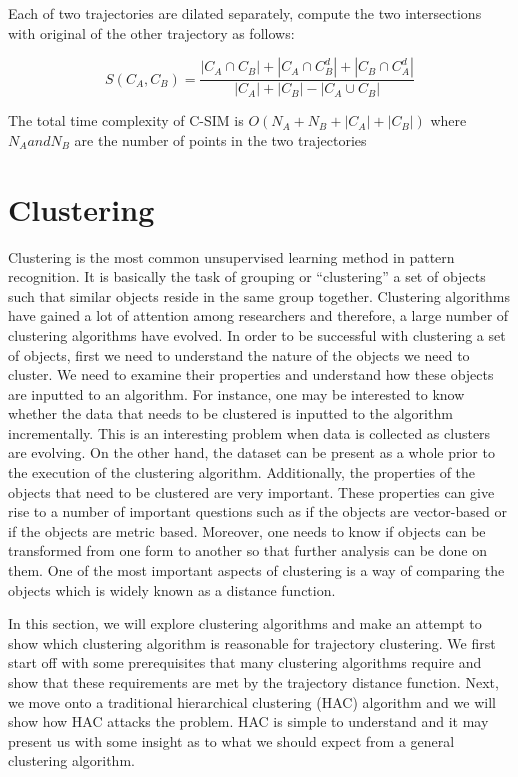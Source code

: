 \documentclass[a4paper, 12pt]{article}
\begin{document}
Each of two trajectories are dilated separately, compute the two intersections with original of the other trajectory as follows:

\begin{equation} \label{eq13}
    S(C_A, C_B) = \frac{|C_A \cap C_B| + |C_A \cap C_B^d| + |C_B \cap C_A^d|}{|C_A| + |C_B| - |C_A \cup C_B|}
\end{equation}

The total time complexity of C-SIM is $O(N_A + N_B + |C_A| + |C_B|)$ where $N_A and N_B$ are the number of points in the two trajectories

\section{Clustering}
Clustering is the most common unsupervised learning method in pattern recognition. It is basically the task of grouping or “clustering” a set of objects such that similar objects reside in the same group together. Clustering algorithms have gained a lot of attention among researchers and therefore, a large number of clustering algorithms have evolved. In order to be successful with clustering a set of objects, first we need to understand the nature of the objects we need to cluster. We need to examine their properties and understand how these objects are inputted to an algorithm. For instance, one may be interested to know whether the data that needs to be clustered is inputted to the algorithm incrementally. This is an interesting problem when data is collected as clusters are evolving. On the other hand, the dataset can be present as a whole prior to the execution of the clustering algorithm. Additionally, the properties of the objects that need to be clustered are very important. These properties can give rise to a number of important questions such as if the objects are vector-based or if the objects are metric based. Moreover, one needs to know if objects can be transformed from one form to another so that further analysis can be done on them. One of the most important aspects of clustering is a way of comparing the objects which is widely known as a distance function. 

In this section, we will explore clustering algorithms and make an attempt to show which clustering algorithm is reasonable for trajectory clustering. We first start off with some prerequisites that many clustering algorithms require and show that these requirements are met by the trajectory distance function. Next, we move onto a traditional hierarchical clustering (HAC) algorithm and we will show how HAC attacks the problem. HAC is simple to understand and it may present us with some insight as to what we should expect from a general clustering algorithm.
\end{document}
